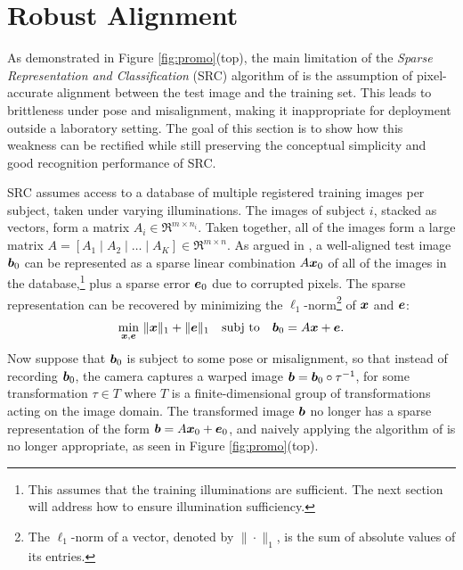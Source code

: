 \section{Robust Alignment}\label{sec:registration} As demonstrated in Figure
\ref{fig:promo}(top), the main limitation of the {\em Sparse Representation and
Classification} (SRC) algorithm of \cite{Wright2009-PAMI} is the assumption of
pixel-accurate alignment between the test image and the training set. This
leads to brittleness under pose and misalignment, making it inappropriate for
deployment outside a laboratory setting. The goal of this section is to show
how this weakness can be rectified while still preserving the conceptual
simplicity and good recognition performance of SRC.

SRC assumes access to a database of multiple registered
training images per subject, taken under varying illuminations.
The images of subject $i$, stacked as vectors, form a matrix
$A_i \in \Re^{m \times n_i}$. Taken together, all of the images
form a large matrix $A = [ A_1 \mid A_2 \mid \dots \mid A_K ]
\in \Re^{m \times n}$. As argued in \cite{Wright2009-PAMI}, a
well-aligned test image $\boldsymbol{b}_0$ can be represented as a sparse
linear combination $A {\boldsymbol{x}}_0$ of all of the images in the
database,\footnote{This assumes that the training illuminations are sufficient. The next section will address how to ensure illumination
sufficiency.} plus a sparse error $\boldsymbol{e}_0$
due to corrupted pixels. The sparse representation can be recovered by
minimizing the $\ell_1$-norm\footnote{The $\ell_1$-norm of a
vector, denoted by $\|\cdot\|_1$, is the sum of absolute values of its entries.} of
${\boldsymbol{x}}$ and $\boldsymbol{e}$:
\begin{equation}
\min_{{\boldsymbol{x}},\boldsymbol{e}} \, \| {\boldsymbol{x}} \|_1 + \| \boldsymbol{e}\|_1 \quad \textup{subj to} \quad \boldsymbol{b}_0 = A {\boldsymbol{x}} + \boldsymbol{e}.
\label{eqn:robust-l1}
\end{equation}
Now suppose that $\boldsymbol{b}_0$ is subject to some pose or
misalignment, so that instead of recording $\boldsymbol{b}_0$, the camera captures
a warped image $\boldsymbol{b} = \boldsymbol{b}_0 \circ \tau^{-1}$, for some
transformation $\tau \in T$ where $T$ is a finite-dimensional
group of transformations acting on the image domain.  The
transformed image $\boldsymbol{b}$ no longer has a sparse representation of
the form $\boldsymbol{b} = A {\boldsymbol{x}}_0 + \boldsymbol{e}_0$, and naively applying the
algorithm of \cite{Wright2009-PAMI} is no longer appropriate,
as seen in Figure \ref{fig:promo}(top).

